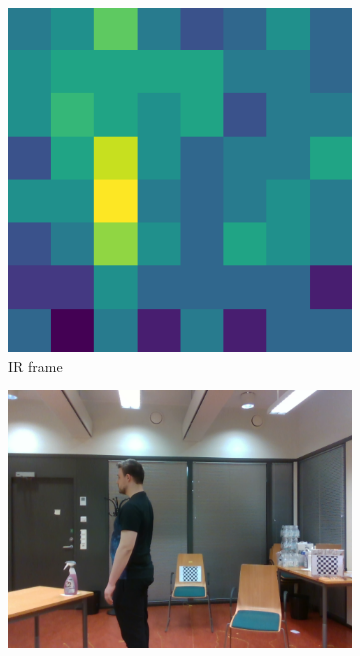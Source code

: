 \begin{figure}
    \centering
    \begin{subfigure}[t]{0.3\textwidth}
    \includegraphics[width=\textwidth]{fig/5/ir_t_7.0.png}
        \caption{IR frame}
        \label{fig:my_label}
    \end{subfigure}
    \hfill
    \begin{subfigure}[t]{0.3\textwidth}
        \includegraphics[width=\textwidth]{fig/5/rgb_t_7.0.png}

\end{subfigure}
\end{figure}

